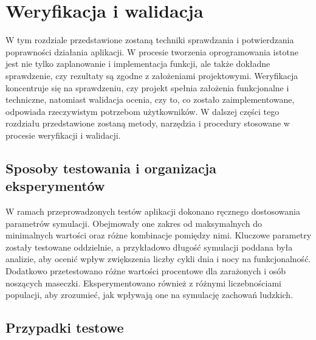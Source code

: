 \chapter{Weryfikacja i walidacja}
\label{ch:06}

W tym rozdziale przedstawione zostaną techniki sprawdzania i potwierdzania poprawności działania aplikacji. W procesie tworzenia oprogramowania istotne jest nie tylko zaplanowanie i implementacja funkcji, ale także dokładne sprawdzenie, czy rezultaty są zgodne z założeniami projektowymi. Weryfikacja koncentruje się na sprawdzeniu, czy projekt spełnia założenia funkcjonalne i techniczne, natomiast walidacja ocenia, czy to, co zostało zaimplementowane, odpowiada rzeczywistym potrzebom użytkowników. W dalszej części tego rozdziału przedstawione zostaną metody, narzędzia i procedury stosowane w procesie weryfikacji i walidacji.\\

\section{Sposoby testowania i organizacja eksperymentów}

W ramach przeprowadzonych testów aplikacji dokonano ręcznego dostosowania parametrów symulacji. Obejmowały one zakres od maksymalnych do minimalnych wartości oraz różne kombinacje pomiędzy nimi. Kluczowe parametry zostały testowane oddzielnie, a przykładowo długość symulacji poddana była analizie, aby ocenić wpływ zwiększenia liczby cykli dnia i nocy na funkcjonalność. Dodatkowo przetestowano różne wartości procentowe dla zarażonych i osób noszących maseczki. Eksperymentowano również z różnymi liczebnościami populacji, aby zrozumieć, jak wpływają one na symulację zachowań ludzkich.


\section{Przypadki testowe}

